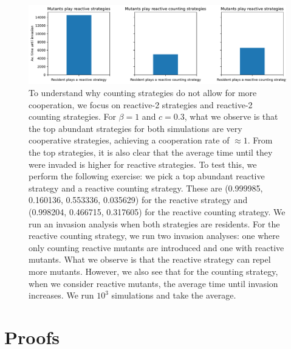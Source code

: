 \documentclass[11pt]{article}
\theoremstyle{plainCl1}
\theoremstyle{plainCl2}
\begin{document}
\begin{figure}[h]
  \centering
  \includegraphics[width=.75\textwidth]{../../figures/siFigCountingReactiveInvasionTime.pdf}
  \caption{To understand why counting strategies do not allow for more cooperation, we
  focus on reactive-2 strategies and reactive-2 counting strategies. For
  \(\beta=1\) and \(c=0.3\), what we observe is that the top abundant strategies
  for both simulations are very cooperative strategies, achieving a cooperation
  rate of \(\approx 1\). From the top strategies, it is also clear that the
  average time until they were invaded is higher for reactive strategies. To test
  this, we perform the following exercise: we pick a top abundant reactive
  strategy and a reactive counting strategy. These are (0.999985, 0.160136,
  0.553336, 0.035629) for the reactive strategy and (0.998204, 0.466715, 0.317605)
  for the reactive counting strategy. We run an invasion analysis when both
  strategies are residents. For the reactive counting strategy, we run two
  invasion analyses: one where only counting reactive mutants are introduced and
  one with reactive mutants. What we observe is that the reactive strategy can
  repel more mutants. However, we also see that for the counting strategy, when we
  consider reactive mutants, the average time until invasion increases. We run
  \(10^3\) simulations and take the average.}
\end{figure}



\newpage
\section{Proofs}

\end{document}
